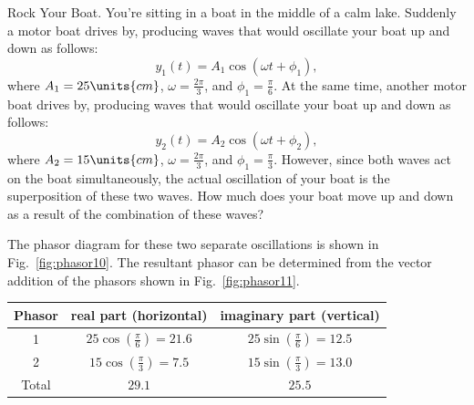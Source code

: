 \begin{example}{Rock Your Boat.} 
\label{example4}
You're sitting in a boat in the middle of a calm lake. Suddenly a motor
boat drives by, producing waves that would oscillate your boat up and
down as follows:
\begin{equation}
y_1(t) = A_1\cos{(\omega t + \phi_1)}, 
\end{equation}
where $A_1 = 25\units{cm}$, $\omega = \frac{2\pi}{3}$, and
$\phi_1 = \frac{\pi}{6}$. At the same time, another motor boat drives
by, producing waves that would oscillate your boat up and down as follows:
\begin{equation}
y_2(t) = A_2\cos{(\omega t + \phi_2)}, 
\end{equation}
where $A_2 = 15\units{cm}$, $\omega = \frac{2\pi}{3}$, and
$\phi_1 = \frac{\pi}{3}$. However, since both waves act on the boat
simultaneously, the actual oscillation of your boat is the
superposition of these two waves. How much does your boat move up and
down as a result of the combination of these waves?
\begin{solution}
The phasor diagram for these two separate oscillations %
is shown in Fig.~\ref{fig:phasor10}.
The resultant phasor can be determined from the vector addition of the
phasors shown in Fig.~\ref{fig:phasor11}.

\renewcommand{\arraystretch}{2.0}
\begin{center}
\begin{tabular}{|c|c|c|}\hline
\quad Phasor\quad &
\quad real part (horizontal) \quad &
\quad imaginary part (vertical) \quad \\ 
\hline\hline
1      & $25\cos\left(\frac{\pi}{6}\right) = 21.6$ 
       & $25\sin\left(\frac{\pi}{6}\right) = 12.5$ \\ \hline 
2      & $15\cos\left(\frac{\pi}{3}\right) =7.5$ 
       & $15\sin\left(\frac{\pi}{3}\right) =13.0$ \\
\hline\hline
Total  & $29.1$   & $25.5$ \\
\hline
\end{tabular}
\end{center}
\renewcommand{\arraystretch}{1.0}


\end{solution}
\end{example}
